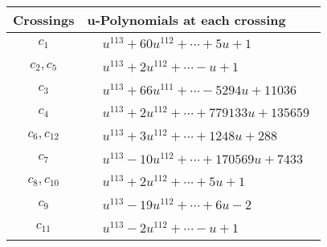 \documentclass[1p]{elsarticle_modified}
\theoremstyle{definition}
\begin{document}
\begin{tabular}{m{50pt}|m{274pt}}
Crossings & \hspace{64pt}u-Polynomials at each crossing \\
\hline $$\begin{aligned}c_{1}\end{aligned}$$&$\begin{aligned}
&u^{113}+60 u^{112}+\cdots+5 u+1
\end{aligned}$\\
\hline $$\begin{aligned}c_{2},c_{5}\end{aligned}$$&$\begin{aligned}
&u^{113}+2 u^{112}+\cdots- u+1
\end{aligned}$\\
\hline $$\begin{aligned}c_{3}\end{aligned}$$&$\begin{aligned}
&u^{113}+66 u^{111}+\cdots-5294 u+11036
\end{aligned}$\\
\hline $$\begin{aligned}c_{4}\end{aligned}$$&$\begin{aligned}
&u^{113}+2 u^{112}+\cdots+779133 u+135659
\end{aligned}$\\
\hline $$\begin{aligned}c_{6},c_{12}\end{aligned}$$&$\begin{aligned}
&u^{113}+3 u^{112}+\cdots+1248 u+288
\end{aligned}$\\
\hline $$\begin{aligned}c_{7}\end{aligned}$$&$\begin{aligned}
&u^{113}-10 u^{112}+\cdots+170569 u+7433
\end{aligned}$\\
\hline $$\begin{aligned}c_{8},c_{10}\end{aligned}$$&$\begin{aligned}
&u^{113}+2 u^{112}+\cdots+5 u+1
\end{aligned}$\\
\hline $$\begin{aligned}c_{9}\end{aligned}$$&$\begin{aligned}
&u^{113}-19 u^{112}+\cdots+6 u-2
\end{aligned}$\\
\hline $$\begin{aligned}c_{11}\end{aligned}$$&$\begin{aligned}
&u^{113}-2 u^{112}+\cdots- u+1
\end{aligned}$\\
\hline
\end{tabular}\\~\\
\end{document}
